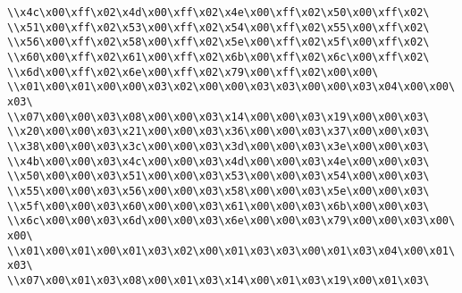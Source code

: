 \verb|\\x4c\x00\xff\x02\x4d\x00\xff\x02\x4e\x00\xff\x02\x50\x00\xff\x02\|\newline
\verb|\\x51\x00\xff\x02\x53\x00\xff\x02\x54\x00\xff\x02\x55\x00\xff\x02\|\newline
\verb|\\x56\x00\xff\x02\x58\x00\xff\x02\x5e\x00\xff\x02\x5f\x00\xff\x02\|\newline
\verb|\\x60\x00\xff\x02\x61\x00\xff\x02\x6b\x00\xff\x02\x6c\x00\xff\x02\|\newline
\verb|\\x6d\x00\xff\x02\x6e\x00\xff\x02\x79\x00\xff\x02\x00\x00\|\newline
\verb|\\x01\x00\x01\x00\x00\x03\x02\x00\x00\x03\x03\x00\x00\x03\x04\x00\x00\x03\|\newline
\verb|\\x07\x00\x00\x03\x08\x00\x00\x03\x14\x00\x00\x03\x19\x00\x00\x03\|\newline
\verb|\\x20\x00\x00\x03\x21\x00\x00\x03\x36\x00\x00\x03\x37\x00\x00\x03\|\newline
\verb|\\x38\x00\x00\x03\x3c\x00\x00\x03\x3d\x00\x00\x03\x3e\x00\x00\x03\|\newline
\verb|\\x4b\x00\x00\x03\x4c\x00\x00\x03\x4d\x00\x00\x03\x4e\x00\x00\x03\|\newline
\verb|\\x50\x00\x00\x03\x51\x00\x00\x03\x53\x00\x00\x03\x54\x00\x00\x03\|\newline
\verb|\\x55\x00\x00\x03\x56\x00\x00\x03\x58\x00\x00\x03\x5e\x00\x00\x03\|\newline
\verb|\\x5f\x00\x00\x03\x60\x00\x00\x03\x61\x00\x00\x03\x6b\x00\x00\x03\|\newline
\verb|\\x6c\x00\x00\x03\x6d\x00\x00\x03\x6e\x00\x00\x03\x79\x00\x00\x03\x00\x00\|\newline
\verb|\\x01\x00\x01\x00\x01\x03\x02\x00\x01\x03\x03\x00\x01\x03\x04\x00\x01\x03\|\newline
\verb|\\x07\x00\x01\x03\x08\x00\x01\x03\x14\x00\x01\x03\x19\x00\x01\x03\|\newline
